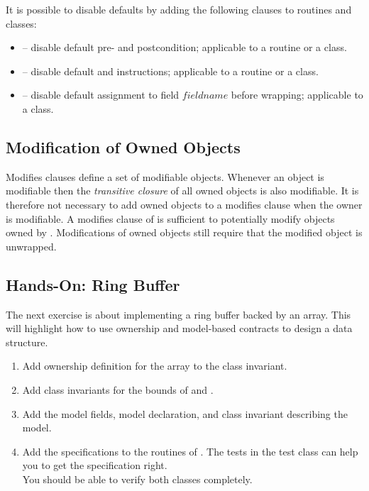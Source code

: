 It is possible to disable defaults by adding the following  clauses to routines and classes:
\begin{itemize}
\item {} -- disable default pre- and postcondition; applicable to a routine or a class.
\item {} -- disable default  and  instructions; applicable to a routine or a class.
\item {} -- disable default assignment to field $fieldname$ before wrapping; applicable to a class.
\end{itemize}

\subsection{Modification of Owned Objects}

Modifies clauses define a set of modifiable objects. Whenever an object is modifiable then the \emph{transitive closure} of all owned objects is also modifiable. It is therefore not necessary to add owned objects to a modifies clause when the owner is modifiable. A modifies clause of  is sufficient to potentially modify objects owned by . Modifications of owned objects still require that the modified object is unwrapped.

\subsection{Hands-On: Ring Buffer}

The next exercise is about implementing a ring buffer backed by an array. This will highlight how to use ownership and model-based contracts to design a data structure.

\begin{enumerate}[label=\bfseries Task \arabic*:, leftmargin=1.8cm]
\item Add ownership definition for the  array to the class invariant.
\item Add class invariants for the bounds of  and .
\item Add the model fields, model declaration, and class invariant describing the model.
\item Add the specifications to the routines of . The tests in the test class can help you to get the specification right. \\
      You should be able to verify both classes completely.
\end{enumerate}


